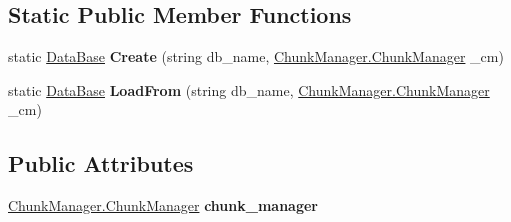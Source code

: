 \subsection*{Static Public Member Functions}
\begin{DoxyCompactItemize}
\item 
\hypertarget{class_dwarf_d_b_1_1_data_structures_1_1_data_base_ace80fe82a351705958326c8d2a7f03ff}{static \hyperlink{class_dwarf_d_b_1_1_data_structures_1_1_data_base}{Data\+Base} {\bfseries Create} (string db\+\_\+name, \hyperlink{class_dwarf_d_b_1_1_chunk_manager_1_1_chunk_manager}{Chunk\+Manager.\+Chunk\+Manager} \+\_\+cm)}\label{class_dwarf_d_b_1_1_data_structures_1_1_data_base_ace80fe82a351705958326c8d2a7f03ff}

\item 
\hypertarget{class_dwarf_d_b_1_1_data_structures_1_1_data_base_af709d60f64dc5065a95dc678ebc03f30}{static \hyperlink{class_dwarf_d_b_1_1_data_structures_1_1_data_base}{Data\+Base} {\bfseries Load\+From} (string db\+\_\+name, \hyperlink{class_dwarf_d_b_1_1_chunk_manager_1_1_chunk_manager}{Chunk\+Manager.\+Chunk\+Manager} \+\_\+cm)}\label{class_dwarf_d_b_1_1_data_structures_1_1_data_base_af709d60f64dc5065a95dc678ebc03f30}

\end{DoxyCompactItemize}
\subsection*{Public Attributes}
\begin{DoxyCompactItemize}
\item 
\hypertarget{class_dwarf_d_b_1_1_data_structures_1_1_data_base_a8ccf11a71c383f6f1ac6870022a261c3}{\hyperlink{class_dwarf_d_b_1_1_chunk_manager_1_1_chunk_manager}{Chunk\+Manager.\+Chunk\+Manager} {\bfseries chunk\+\_\+manager}}\label{class_dwarf_d_b_1_1_data_structures_1_1_data_base_a8ccf11a71c383f6f1ac6870022a261c3}

\end{DoxyCompactItemize}
